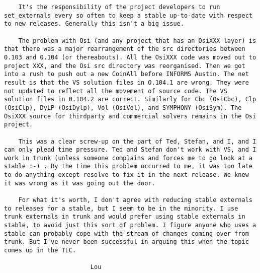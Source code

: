 \begin{verbatim}
    It's the responsibility of the project developers to run set_externals every so often to keep a stable up-to-date with respect to new releases. Generally this isn't a big issue.

    The problem with Osi (and any project that has an OsiXXX layer) is that there was a major rearrangement of the src directories between 0.103 and 0.104 (or thereabouts). All the OsiXXX code was moved out to project XXX, and the Osi src directory was reorganised. Then we got into a rush to push out a new CoinAll before INFORMS Austin. The net result is that the VS solution files in O.104.1 are wrong. They were not updated to reflect all the movement of source code. The VS solution files in 0.104.2 are correct. Similarly for Cbc (OsiCbc), Clp (OsiClp), DyLP (OsiDylp), Vol (OsiVol), and SYMPHONY (OsiSym). The OsiXXX source for thirdparty and commercial solvers remains in the Osi project.

    This was a clear screw-up on the part of Ted, Stefan, and I, and I can only plead time pressure. Ted and Stefan don't work with VS, and I work in trunk (unless someone complains and forces me to go look at a stable :-) . By the time this problem occurred to me, it was too late to do anything except resolve to fix it in the next release. We knew it was wrong as it was going out the door.

    For what it's worth, I don't agree with reducing stable externals to releases for a stable, but I seem to be in the minority. I use trunk externals in trunk and would prefer using stable externals in stable, to avoid just this sort of problem. I figure anyone who uses a stable can probably cope with the stream of changes coming over from trunk. But I've never been successful in arguing this when the topic comes up in the TLC.

                        Lou

\end{verbatim}

